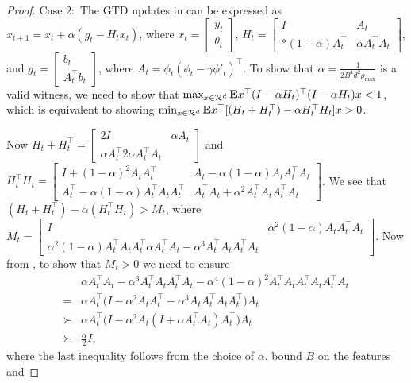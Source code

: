 \begin{proof}
Case $2:$ The GTD updates in  can be expressed as $x_{t+1}=x_t+\alpha (g_t -H_t x_t)$, where $x_t=\left[\begin{matrix}y_t\\\theta_t\end{matrix}\right]$, $H_t=\left[\begin{matrix}I &A_t \\*(1-\alpha)A^\top_t & \alpha A_t^\top A_t\end{matrix}\right]$, and $g_t=\left[\begin{matrix} b_t\\ A_t^\top b_t\end{matrix}\right]$, where $A_t=\phi_t(\phi_t-\gamma{\phi'}_t)^\top$. To show that $\alpha=\frac{1}{2B^4 d^2 \rho_{\max}}$ is a valid witness, we need to show that  $\max_{x\in \mathcal{R}^d}\mathbf{E}{x^\top(I-\alpha H_t)^\top (I-\alpha H_t)x}<1$, which is equivalent to showing $\min_{x\in \mathcal{R}^d}\mathbf{E}{x^\top[(H_t+H_t^\top) -\alpha H_t^\top H_t]x}>0$.

Now $H_t+H_t^\top=\left[\begin{matrix} 2I & \alpha A_t\\ \alpha A_t^\top 2\alpha A_t^\top A_t\end{matrix}\right]$ and $H_t^\top H_t=\left[\begin{matrix} I+(1-\alpha)^2A_tA_t^\top & A_t-\alpha(1-\alpha)A_tA_t^\top A_t\\ A_t^\top-\alpha(1-\alpha)A_t^\top A_t A_t^\top & A_t^\top A_t+\alpha^2A_t^\top A_t A_t^\top A_t\end{matrix}\right]$.  We see that $(H_t+H_t^\top) -\alpha(H_t^\top H_t) > M_t$, where $M_t=\left[\begin{matrix}I &\alpha^2(1-\alpha) A_tA_t^\top A_t\\ \alpha^2(1-\alpha) A_t^\top A_t A_t^\top \alpha A_t^\top A_t-\alpha^3A_t^\top A_tA_t^\top A_t\end{matrix}\right]$. Now from , to show that $M_t>0$ we need to ensure 
\begin{align}
&\alpha A_t^\top A_t -\alpha^3A_t^\top A_t A_t^\top A_t - \alpha^4(1-\alpha)^2A_t^\top A_t A_t^\top A_t A_t^\top A_t\\
=&\alpha A_t^\top\big(I-\alpha^2 A_tA_t^\top-\alpha^3A_tA_t^\top A_tA_t^\top\big)A_t\\
\succ &\alpha A_t^\top\big(I-\alpha^2 A_t(I+\alpha A_t^\top A_t)A_t^\top\big)A_t\\
\succ& \frac{\alpha}{2} I,
\end{align}
where the last inequality follows from the choice of $\alpha$, bound $B$ on the features and 
\end{proof}

